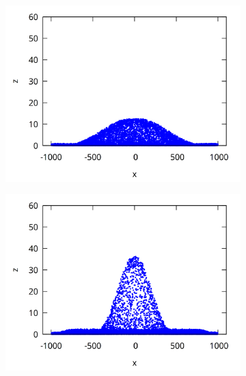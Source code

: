 \begin{figure}
\centering
\begin{subfigure}{0.33\textwidth}
    \centering
    \includegraphics[width=1.\textwidth]{img/lateral_70.png}
\end{subfigure}%
\begin{subfigure}{0.33\textwidth}
    \centering
    \includegraphics[width=1.\textwidth]{img/lateral_120.png}


\end{subfigure}
\end{figure}
